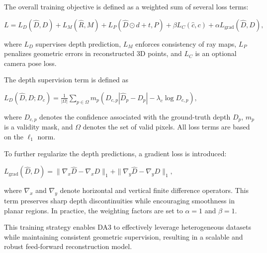 The overall training objective is defined as a weighted sum of several loss terms:
\begin{center}
    $\displaystyle L = L_D(\hat{D}, D) + L_M(\hat{R}, M) + L_P(\hat{D} \odot d + t, P) + \beta L_C(\hat{c}, c) + \alpha L_{\text{grad}}(\hat{D}, D),$
\end{center}
where $L_D$ supervises depth prediction, $L_M$ enforces consistency of ray maps, $L_P$ penalizes geometric errors in reconstructed 3D points, and $L_C$ is an optional camera pose loss.

The depth supervision term is defined as
\begin{center}
    $\displaystyle L_D(\hat{D}, D; D_c) = \frac{1}{|\Omega|} \sum_{p \in \Omega} m_p (D_{c,p} |\hat{D}_p - D_p| - \lambda_c \log D_{c,p}), $
\end{center}
where $D_{c,p}$ denotes the confidence associated with the ground-truth depth $D_p$, $m_p$ is a validity mask, and $\Omega$ denotes the set of valid pixels. All loss terms are based on the $\ell_1$ norm.

To further regularize the depth predictions, a gradient loss is introduced:
\begin{center}
    $\displaystyle L_{\text{grad}}(\hat{D}, D) = \| \nabla_x \hat{D} - \nabla_x D \|_1 + \| \nabla_y \hat{D} - \nabla_y D \|_1, $
\end{center}
where $\nabla_x$ and $\nabla_y$ denote horizontal and vertical finite difference operators. This term preserves sharp depth discontinuities while encouraging smoothness in planar regions. In practice, the weighting factors are set to $\alpha=1$ and $\beta=1$.

This training strategy enables DA3 to effectively leverage heterogeneous datasets while maintaining consistent geometric supervision, resulting in a scalable and robust feed-forward reconstruction model.


